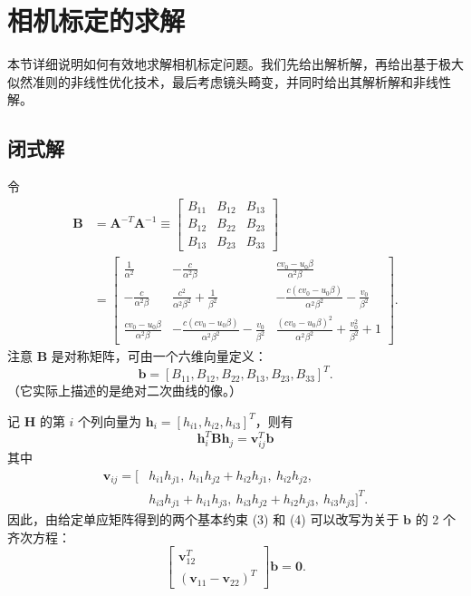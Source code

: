 \documentclass[a4paper,twocolumn,zihao=5,fontset=none,UTF8]{ctexart}
\newcommand{\A}{\mathbf{A}}
\newcommand{\B}{\mathbf{B}}
\newcommand{\Hm}{\mathbf{H}}
\newcommand{\h}{\mathbf{h}}
\newcommand{\bv}{\mathbf{b}}
\newcommand{\vvec}{\mathbf{v}}
\begin{document}
\section{相机标定的求解}

本节详细说明如何有效地求解相机标定问题。我们先给出解析解，再给出基于极大似然准则的非线性优化技术，最后考虑镜头畸变，并同时给出其解析解和非线性解。

\subsection{闭式解}

令
\begin{equation}
\begin{aligned}
  \B&=\A^{-T}\A^{-1}\equiv
  \begin{bmatrix}B_{11} & B_{12} & B_{13}\\ B_{12} & B_{22} & B_{23}\\ B_{13} & B_{23} & B_{33}\end{bmatrix}\\
  &={\scriptstyle\begin{bmatrix}
    \frac{1}{\alpha^2} & -\frac{c}{\alpha^2\beta} & \frac{cv_0-u_0\beta}{\alpha^2\beta}\\[4pt]
    -\frac{c}{\alpha^2\beta} & \frac{c^2}{\alpha^2\beta^2}+\frac{1}{\beta^2} &
      -\frac{c(cv_0-u_0\beta)}{\alpha^2\beta^2}-\frac{v_0}{\beta^2}\\[4pt]
    \frac{cv_0-u_0\beta}{\alpha^2\beta} & -\frac{c(cv_0-u_0\beta)}{\alpha^2\beta^2}-\frac{v_0}{\beta^2} &
      \frac{(cv_0-u_0\beta)^2}{\alpha^2\beta^2}+\frac{v_0^2}{\beta^2}+1
  \end{bmatrix}}.
\end{aligned}
\end{equation}
注意 $\B$ 是对称矩阵，可由一个六维向量定义：
\begin{equation}
  \bv=[B_{11},B_{12},B_{22},B_{13},B_{23},B_{33}]^T .
\end{equation}
（它实际上描述的是绝对二次曲线的像。）

记 $\Hm$ 的第 $i$ 个列向量为 $\h_i=[h_{i1},h_{i2},h_{i3}]^T$，则有
\begin{equation}
  \h_i^T\B\h_j=\vvec_{ij}^T\bv
\end{equation}
其中
\begin{equation*}
\begin{aligned}
  \vvec_{ij}=[&h_{i1}h_{j1},\ h_{i1}h_{j2}+h_{i2}h_{j1},\ h_{i2}h_{j2},\\
  &h_{i3}h_{j1}+h_{i1}h_{j3},\ h_{i3}h_{j2}+h_{i2}h_{j3},\ h_{i3}h_{j3}]^T .
\end{aligned}
\end{equation*}
因此，由给定单应矩阵得到的两个基本约束 (3) 和 (4) 可以改写为关于 $\bv$ 的 2 个齐次方程：
\begin{equation}
  \begin{bmatrix}\vvec_{12}^T\\ (\vvec_{11}-\vvec_{22})^T\end{bmatrix}\bv=\mathbf{0}.
\end{equation}
\end{document}
